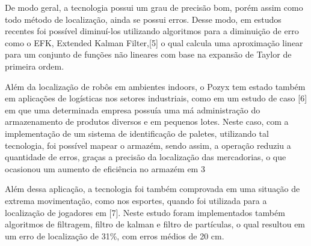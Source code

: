 De modo geral, a tecnologia possui um grau de precisão bom, porém assim como todo método de localização, ainda se possui erros. Desse modo, em estudos recentes foi possível diminuí-los utilizando algoritmos para a diminuição de erro como o EFK, Extended Kalman Filter,[5] o qual calcula uma aproximação linear para um conjunto de funções não lineares com base na expansão de Taylor de primeira ordem.

Além da localização de robôs em ambientes indoors, o Pozyx tem estado também em aplicações de logísticas nos setores industriais, como em um estudo de caso [6] em que uma determinada empresa possuía uma má administração do  armazenamento de produtos diversos e em pequenos lotes. Neste caso, com a implementação de um sistema de identificação de paletes, utilizando tal tecnologia, foi possível mapear o armazém, sendo assim, a operação reduziu a quantidade de erros, graças a precisão da localização das mercadorias, o que ocasionou um aumento de eficiência no armazém em 3%

Além dessa aplicação, a tecnologia foi também comprovada em uma situação de extrema movimentação, como nos esportes, quando foi utilizada para a localização de jogadores em [7]. Neste estudo foram implementados também algoritmos de filtragem, filtro de kalman e filtro de partículas, o qual resultou em um erro de localização de 31\%, com erros médios de 20 cm. 




